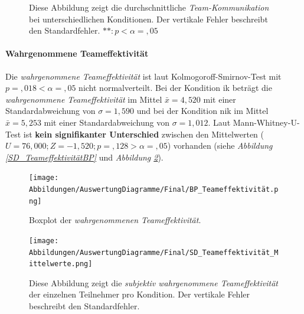 \documentclass[a4paper,11pt]{article}%
\renewcommand{\\}{\vspace*{0.5\baselineskip} \newline}
\begin{document}
{\begin{figure}[H]
\begin{minipage}[t]{.5\linewidth}
      \caption[Durchschnittliche Team-Kommunikation]{Diese Abbildung zeigt die durchschnittliche \textit{Team-Kommunikation} bei unterschiedlichen Konditionen. Der vertikale Fehler beschreibt den Standardfehler. $** : p < \alpha = ,05$}
       \label{SD_Teamkommunikation_Mittelwerte}
   \end{minipage}
\end{figure}

\newpage

\paragraph{Wahrgenommene Teameffektivität}
\label{WTE}
Die \textit{wahrgenommene Teameffektivität} ist laut Kolmogoroff-Smirnov-Test mit $p =,018 < \alpha = ,05$ nicht normalverteilt. 
Bei der Kondition \ac{ik} beträgt die \textit{wahrgenommene Teameffektivität} im Mittel $\bar{x} = 4,520$ mit einer Standardabweichung von $\sigma = 1,590$ und bei der Kondition \ac{nik} im Mittel $\bar{x} = 5,253$ mit einer Standardabweichung von $\sigma = 1,012$. 
Laut Mann-Whitney-U-Test ist \textbf{kein signifikanter Unterschied} zwischen den Mittelwerten ($U = 76,000; Z = -1,520; p =,128 > \alpha = ,05$) vorhanden  (siehe \textit{Abbildung \ref{SD_TeameffektivitätBP}} und \textit{Abbildung \ref{SD_Teameffektivität_Mittelwerte}}).

		\begin{figure}[H]
   \begin{minipage}[t]{.5\linewidth} %
      \texttt{[image: Abbildungen/AuswertungDiagramme/Final/BP\_Teameffektivität.png]}
      \caption[Boxplot der wahrgenommenen Teameffektivität]{Boxplot der \textit{wahrgenommenen Teameffektivität}.}
            \label{SD_TeameffektivitätBP}
   \end{minipage}
   \hspace{.02\linewidth}%
   \begin{minipage}[t]{.5\linewidth} %
     \texttt{[image: Abbildungen/AuswertungDiagramme/Final/SD\_Teameffektivität\_Mittelwerte.png]}
      \caption[Durchschnittlich wahrgenommene Teameffektivität]{Diese Abbildung zeigt die \textit{subjektiv wahrgenommene Teameffektivität} der einzelnen Teilnehmer pro Kondition. Der vertikale Fehler beschreibt den Standardfehler.}
       \label{SD_Teameffektivität_Mittelwerte}
   \end{minipage}
\end{figure}

}
\end{document}
